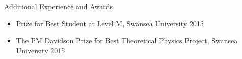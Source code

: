 \documentclass[]{mcdowellcv}
\begin{document}
	\begin{cvsection}{Additional Experience and Awards}
		\begin{cvsubsection}{}{}{}	
			\begin{itemize}
                \item Prize for Best Student at Level M, Swansea University 2015
                \item The PM Davidson Prize for Best Theoretical Physics Project, Swansea University 2015
			\end{itemize}
		\end{cvsubsection}
	\end{cvsection}
\end{document}
